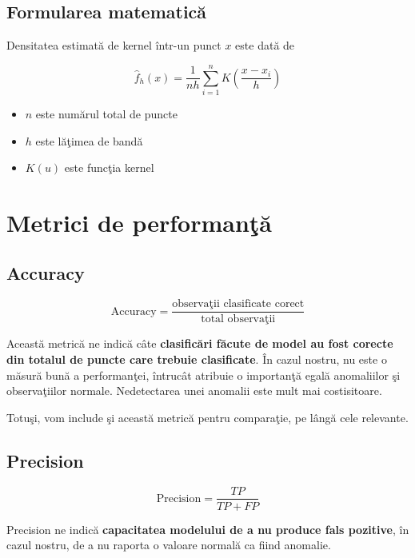 \subsection{Formularea matematică}

Densitatea estimată de kernel într-un punct $x$ este dată de

\begin{equation}
\hat{f}_h(x) = \frac{1}{nh} \sum_{i=1}^{n} K\left(\frac{x - x_i}{h}\right)
\end{equation}

\begin{itemize}
    \item $n$ este numărul total de puncte
    \item $h$ este lăţimea de bandă
    \item $K(u)$ este funcţia kernel 
\end{itemize}

\section{Metrici de performanţă}

\subsection{Accuracy}

\begin{equation}
    \text{Accuracy} = \frac{\text{observaţii clasificate corect}}{\text{total observaţii}}
\end{equation}

Această metrică ne indică câte 
\textbf{clasificări făcute de model au fost corecte din 
totalul de puncte care trebuie clasificate}. În cazul nostru, nu este o măsură bună 
a performanţei, întrucât atribuie o importanţă egală anomaliilor şi observaţiilor 
normale. Nedetectarea unei anomalii este mult mai costisitoare.

Totuşi, vom include şi această metrică pentru comparaţie, pe lângă cele relevante.

\subsection{Precision}

\begin{equation}
    \text{Precision} = \frac{TP}{TP + FP}
\end{equation}

Precision ne indică \textbf{capacitatea modelului de a nu produce fals pozitive}, în cazul nostru,
de a nu raporta o valoare normală ca fiind anomalie.

